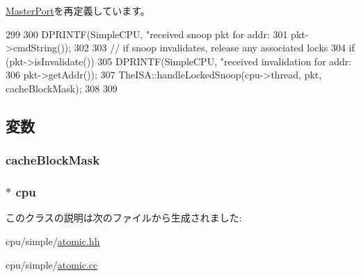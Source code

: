 \hyperlink{classMasterPort_af5b15bc08781cf0ba6190efc37d5b67e}{MasterPort}を再定義しています。


\begin{DoxyCode}
299 {
300     DPRINTF(SimpleCPU, "received snoop pkt for addr:%
301             pkt->cmdString());
302 
303     // if snoop invalidates, release any associated locks
304     if (pkt->isInvalidate()) {
305         DPRINTF(SimpleCPU, "received invalidation for addr:%
306                 pkt->getAddr());
307         TheISA::handleLockedSnoop(cpu->thread, pkt, cacheBlockMask);
308     }
309 }
\end{DoxyCode}


\subsection{変数}
\hypertarget{classAtomicSimpleCPU_1_1AtomicCPUDPort_af4264b12b32db39099b579e1ed670312}{
\subsubsection[{cacheBlockMask}]{ {\bf cacheBlockMask}}}
\label{classAtomicSimpleCPU_1_1AtomicCPUDPort_af4264b12b32db39099b579e1ed670312}
\hypertarget{classAtomicSimpleCPU_1_1AtomicCPUDPort_a9b015cabe76f0632445ecc63fa883163}{
\subsubsection[{cpu}]{$\ast$ {\bf cpu}}}
\label{classAtomicSimpleCPU_1_1AtomicCPUDPort_a9b015cabe76f0632445ecc63fa883163}


このクラスの説明は次のファイルから生成されました:\begin{DoxyCompactItemize}
\item 
cpu/simple/\hyperlink{atomic_8hh}{atomic.hh}\item 
cpu/simple/\hyperlink{atomic_8cc}{atomic.cc}\end{DoxyCompactItemize}
